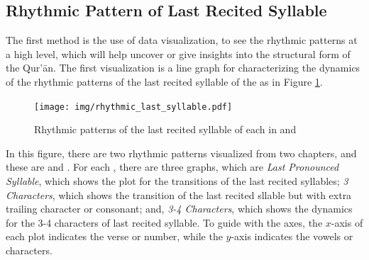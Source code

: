 \subsection{Rhythmic Pattern of Last Recited Syllable}\label{sec:last_recited_syllable_pattern}
The first method is the use of data visualization, to see the rhythmic patterns at a high level, which will help uncover or give insights into the structural form of the Qur'\=an. The first visualization is a line graph for characterizing the dynamics of the rhythmic patterns of the last recited syllable of the   as in Figure \ref{fig:result_last_syllable_rhythmic}.

\begin{figure}[!t]
    \centering
    \texttt{[image: img/rhythmic\_last\_syllable.pdf]}
    \caption{Rhythmic patterns of the last recited syllable of each   in   and  }
    \label{fig:result_last_syllable_rhythmic}
\end{figure}

In this figure, there are two rhythmic patterns visualized from two chapters, and these are   and  . For each  , there are three graphs, which are \textit{Last Pronounced Syllable}, which shows the plot for the transitions of the last recited syllables; \textit{3 Characters}, which shows the transition of the last recited sllable but with extra trailing character or consonant; and, \textit{3-4 Characters}, which shows the dynamics for the 3-4 characters of last recited syllable. To guide with the axes, the $x$-axis of each plot indicates the verse or   number, while the $y$-axis indicates the vowels or characters.

